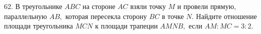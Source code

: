 62. В треугольнике $ABC$ на стороне $AC$ взяли точку $M$ и провели прямую, параллельную $AB,$ которая пересекла сторону $BC$ в точке $N.$ Найдите отношение площади треугольника $MCN$ к площади трапеции $AMNB,$ если $AM:MC=3:2.$\\
